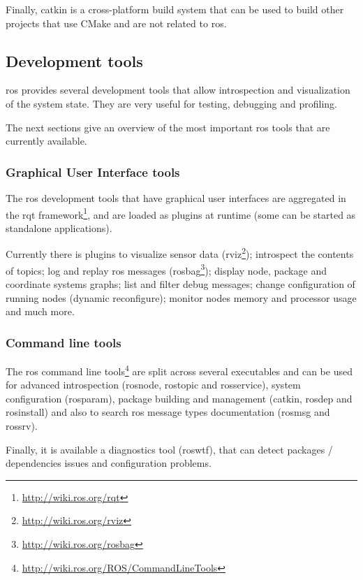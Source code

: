 Finally, catkin is a cross-platform build system that can be used to build other projects that use CMake and are not related to \gls{ros}.


\subsection{Development tools}

\gls{ros} provides several development tools that allow introspection and visualization of the system state. They are very useful for testing, debugging and profiling.

The next sections give an overview of the most important \gls{ros} tools that are currently available.


\subsubsection{Graphical User Interface tools}

The \gls{ros} development tools that have graphical user interfaces are aggregated in the rqt framework\footnote{\url{http://wiki.ros.org/rqt}}, and are loaded as plugins at runtime (some can be started as standalone applications).

Currently there is plugins to visualize sensor data (rviz\footnote{\url{http://wiki.ros.org/rviz}}); introspect the contents of topics; log and replay \gls{ros} messages (rosbag\footnote{\url{http://wiki.ros.org/rosbag}}); display node, package and coordinate systems graphs; list and filter debug messages; change configuration of running nodes (dynamic reconfigure); monitor nodes memory and processor usage and much more.


\subsubsection{Command line tools}

The \gls{ros} command line tools\footnote{\url{http://wiki.ros.org/ROS/CommandLineTools}} are split across several executables and can be used for advanced introspection (rosnode, rostopic and rosservice), system configuration (rosparam), package building and management (catkin, rosdep and rosinstall) and also to search \gls{ros} message types documentation (rosmsg and rossrv).

Finally, it is available a diagnostics tool (roswtf), that can detect packages / dependencies issues and configuration problems.



